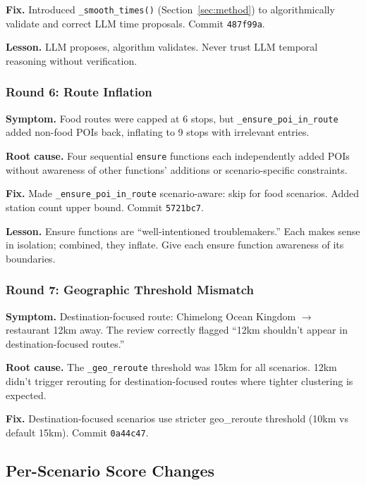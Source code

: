 \textbf{Fix.} Introduced \texttt{\_smooth\_times()} (Section~\ref{sec:method}) to algorithmically validate and correct LLM time proposals. Commit \texttt{487f99a}.

\textbf{Lesson.} LLM proposes, algorithm validates. Never trust LLM temporal reasoning without verification.

\subsubsection{Round 6: Route Inflation}

\textbf{Symptom.} Food routes were capped at 6 stops, but \texttt{\_ensure\_poi\_in\_route} added non-food POIs back, inflating to 9 stops with irrelevant entries.

\textbf{Root cause.} Four sequential \texttt{ensure} functions each independently added POIs without awareness of other functions' additions or scenario-specific constraints.

\textbf{Fix.} Made \texttt{\_ensure\_poi\_in\_route} scenario-aware: skip for food scenarios. Added station count upper bound. Commit \texttt{5721bc7}.

\textbf{Lesson.} Ensure functions are ``well-intentioned troublemakers.'' Each makes sense in isolation; combined, they inflate. Give each ensure function awareness of its boundaries.

\subsubsection{Round 7: Geographic Threshold Mismatch}

\textbf{Symptom.} Destination-focused route: Chimelong Ocean Kingdom $\rightarrow$ restaurant 12km away. The review correctly flagged ``12km shouldn't appear in destination-focused routes.''

\textbf{Root cause.} The \texttt{\_geo\_reroute} threshold was 15km for all scenarios. 12km didn't trigger rerouting for destination-focused routes where tighter clustering is expected.

\textbf{Fix.} Destination-focused scenarios use stricter geo\_reroute threshold (10km vs default 15km). Commit \texttt{0a44c47}.

\subsection{Per-Scenario Score Changes}

